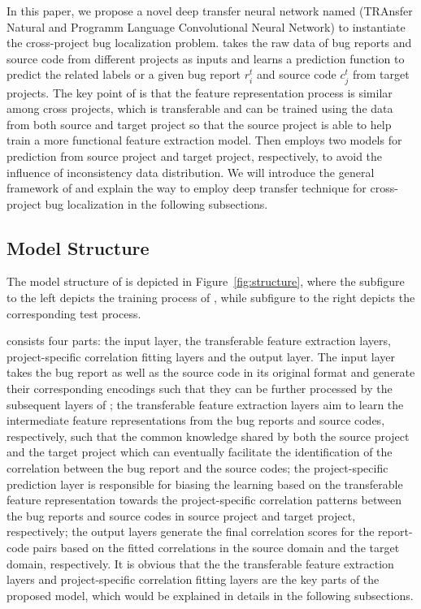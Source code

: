 In this paper, we propose a novel deep transfer neural network named \TRANPCNN (TRAnsfer Natural and Programm Language Convolutional Neural Network) to instantiate the cross-project bug localization problem. \TRANPCNN takes the raw data of bug reports and source code from different projects as inputs and learns a prediction function to predict the related labels or a given bug report $r^t_i$ and source code $c^t_j$ from target projects. The key point of \TRANPCNN is that the feature representation process is similar among cross projects, which is transferable and can be trained using the data from both source and target project so that the source project is able to help train a more functional feature extraction model. Then \TRANPCNN employs two models for prediction from source project and target project, respectively, to avoid the influence of inconsistency data distribution. We will introduce the general framework of \TRANPCNN and explain the way to employ deep transfer technique for cross-project bug localization in the following subsections.

\subsection{Model Structure}
The model structure of \TRANPCNN is depicted in Figure~\ref{fig:structure}, where the subfigure to the left depicts the training process of \TRANPCNN, while subfigure to the right depicts the corresponding test process. 

\TRANPCNN consists four parts: the input layer, the transferable feature extraction layers, project-specific correlation fitting layers and the output layer. The input layer takes the bug report as well as the source code in its original format and generate their corresponding encodings such that they can be further processed by the subsequent layers of \TRANPCNN; the transferable feature extraction layers aim to learn the intermediate feature representations from the bug reports and source codes, respectively, such that the common knowledge shared by both the source project and the target project which can eventually facilitate the identification of the correlation between the bug report and the source codes; the project-specific prediction layer is responsible for biasing the learning based on the transferable feature representation towards the project-specific correlation patterns between the bug reports and source codes in source project and target project, respectively; the output layers generate the final correlation scores for the report-code pairs based on the fitted correlations in the source domain and the target domain, respectively. It is obvious that the the transferable feature extraction layers and project-specific correlation fitting layers are the key parts of the proposed model, which would be explained in details in the following subsections.

